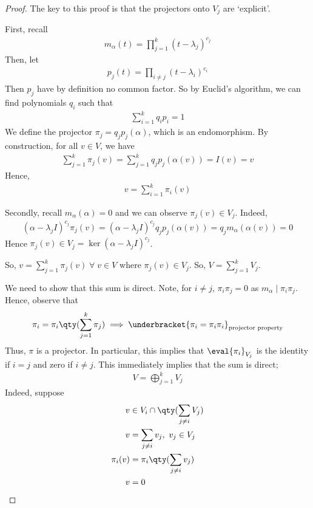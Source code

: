 \begin{proof}
	The key to this proof is that the projectors onto $V_j$ are `explicit'.

	First, recall
	\begin{align*}
		m_\alpha(t) = \prod_{j=1}^k (t-\lambda_j)^{c_j}
	\end{align*}
	Then, let
	\begin{align*}
		p_j(t) = \prod_{i \neq j} (t - \lambda_i)^{c_i}
	\end{align*}
	Then $p_j$ have by definition no common factor.
	So by Euclid's algorithm, we can find polynomials $q_i$ such that
	\begin{align*}
		\sum_{i=1}^k q_i p_i = 1
	\end{align*}
	We define the projector $\pi_j = q_j p_j(\alpha)$, which is an endomorphism.
	By construction, for all $v \in V$, we have
	\begin{align*}
		\sum_{j=1}^k \pi_j(v) = \sum_{j=1}^k q_j p_j(\alpha(v)) = I(v) = v
	\end{align*}
	Hence,
	\begin{align*}
		v = \sum_{i=1}^k \pi_i(v)
	\end{align*}

	Secondly, recall $m_\alpha(\alpha) = 0$ and we can observe $\pi_j(v) \in V_j$.
	Indeed,
	\begin{align*}
		(\alpha - \lambda_j I)^{c_j} \pi_j(v) = (\alpha - \lambda_j I)^{c_j} q_j p_j(\alpha(v)) = q_j m_\alpha (\alpha(v)) = 0
	\end{align*}
	Hence $\pi_j(v) \in V_j = \ker (\alpha - \lambda_j I)^{c_j}$.

	So, $v = \sum_{j=1}^{k} \pi_j(v) \; \forall \; v \in V$ where $\pi_j(v) \in V_j$.
	So, $V = \sum_{j=1}^k V_j$.

	We need to show that this sum is direct.
	Note, for $i \neq j$, $\pi_i \pi_j = 0$ as $m_\alpha \mid \pi_i \pi_j$.
	Hence, observe that
	\begin{align*}
		\pi_i = \pi_i \qty(\sum_{j=1}^k \pi_j) \implies  \underbracket{\pi_i = \pi_i \pi_i}_\text{projector property}
	\end{align*}
	Thus, $\pi$ is a projector.
	In particular, this implies that $\eval{\pi_i}_{V_j}$ is the identity if $i = j$ and zero if $i \neq j$.
	This immediately implies that the sum is direct;
	\begin{align*}
		V = \bigoplus_{j=1}^k V_j
	\end{align*}
	Indeed, suppose
	\begin{align*}
		v &\in V_i \cap \qty(\sum_{j \neq i} V_j) \\
		v &= \sum_{j \neq i} v_j,\ v_j \in V_j \\
		\pi_i(v) &= \pi_i\qty(\sum_{j \neq i} v_j) \\
		v &= 0
	\end{align*}
\end{proof}